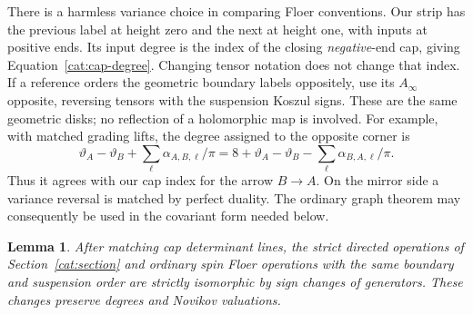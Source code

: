 \documentclass[11pt]{article}
\newtheorem{lemma}[theorem]{Lemma}
\theoremstyle{definition}
\theoremstyle{remark}
\numberwithin{equation}{section}
\begin{document}
There is a harmless variance choice in comparing Floer conventions.
Our strip has the previous label at height zero and the next at height
one, with inputs at positive ends.  Its input degree is the index of
the closing \emph{negative}-end cap, giving
Equation~\eqref{cat:cap-degree}.  Changing tensor notation does not
change that index.  If a reference orders the geometric boundary
labels oppositely, use its \(A_\infty\) opposite, reversing tensors with
the suspension Koszul signs.  These are the same geometric disks;
no reflection of a holomorphic map is involved.  For example, with
matched grading lifts, the degree assigned to the opposite corner is
\[
 \vartheta_A-\vartheta_B
       +\sum_\ell\alpha_{A,B,\ell}/\pi
 =8+\vartheta_A-\vartheta_B
       -\sum_\ell\alpha_{B,A,\ell}/\pi.
\]
Thus it agrees with our cap index for the arrow \(B\to A\).
On the mirror side a variance reversal is matched by perfect duality.
The ordinary graph theorem may consequently be used in the
covariant form needed below.

\begin{lemma}\label{cat:sign-comparison}
After matching cap determinant lines, the strict directed operations
of Section~\ref{cat:section} and ordinary spin Floer operations with
the same boundary and suspension order are strictly isomorphic by
sign changes of generators.  These changes preserve degrees and
Novikov valuations.
\end{lemma}
\end{document}
